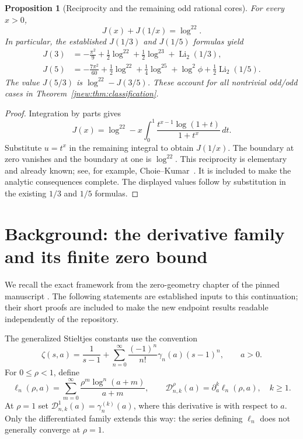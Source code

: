 \documentclass[11pt,a4paper]{article}
\newtheorem{proposition}[theorem]{Proposition}
\theoremstyle{definition}
\theoremstyle{remark}
\numberwithin{equation}{section}
\begin{document}
\begin{proposition}[Reciprocity and the remaining odd rational cores]
\label{jnew:prop:reciprocity}
For every $x>0$,
\begin{equation}\label{jnew:eq:analytic-reciprocity}
 J(x)+J(1/x)=\log^22.
\end{equation}
In particular, the established $J(1/3)$ and $J(1/5)$ formulas yield
\begin{align*}
 J(3)&=-\frac{\pi^2}{9}+\frac12\log^22+\frac12\log^23
                                     +\operatorname{Li}_2(1/3),\\
 J(5)&=-\frac{7\pi^2}{60}+\frac12\log^22+\frac14\log^25
                    +\log^2\phi+\frac12\operatorname{Li}_2(1/5).
\end{align*}
The value $J(5/3)$ is $\log^22-J(3/5)$. These account for all
nontrivial odd/odd cases in Theorem~\ref{jnew:thm:classification}.
\end{proposition}
\begin{proof}
Integration by parts gives
\[
 J(x)=\log^22-
 x\int_0^1\frac{t^{x-1}\log(1+t)}{1+t^x}\,dt.
\]
Substitute $u=t^x$ in the remaining integral to obtain $J(1/x)$.
The boundary at zero vanishes and the boundary at one is $\log^22$.
This reciprocity is elementary and already known; see, for example,
Choie--Kumar~\cite[Theorem~3.1]{ChoieKumar2023}. It is included to
make the analytic consequences complete. The displayed values follow
by substitution in the existing $1/3$ and $1/5$ formulas.
\end{proof}

\section{Background: the derivative family and its finite zero bound}
\label{lerchboundary:sec:background}

We recall the exact framework from the zero-geometry chapter of the
pinned manuscript \cite{ProveItSnapshot}. The following statements are established inputs to
this continuation; their short proofs are included to make the new
endpoint results readable independently of the repository.

The generalized Stieltjes constants use the convention
\[
 \zeta(s,a)=\frac1{s-1}
 +\sum_{n=0}^{\infty}\frac{(-1)^n}{n!}\gamma_n(a)(s-1)^n,
 \qquad a>0.
\]
For $0\leq\rho<1$, define
\[
 \ell_n(\rho,a)=\sum_{m=0}^{\infty}
      \frac{\rho^m\log^n(a+m)}{a+m},
 \qquad
 \mathcal D_{n,k}^{\rho}(a)=\partial_a^k\ell_n(\rho,a),
 \quad k\geq1.
\]
At $\rho=1$ set $\mathcal D_{n,k}^{1}(a)=\gamma_n^{(k)}(a)$,
where this derivative is with respect to $a$. Only the differentiated
family extends this way: the series defining $\ell_n$ does not
generally converge at $\rho=1$.
\end{document}

